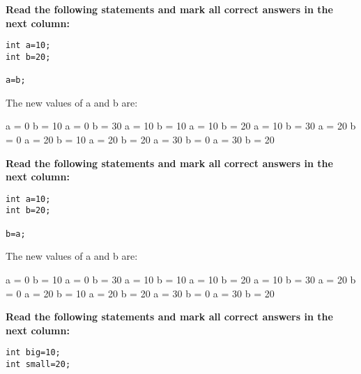 \documentclass[10pt]{exam}
\begin{document}
\begin{questions}
\vspace{1cm}  \begin{minipage}[t][][t]{0.18\textwidth}
    \question \bf Read the following statements and mark all correct answers in the next column: \raggedright

    \begin{lstlisting}
int a=10;
int b=20;

a=b;    
    \end{lstlisting}
  \end{minipage}
  \hfill
  \begin{minipage}[t][][t]{0.75\textwidth}
    The new values of a and b are:
    \begin{multicols*}{3}
\begin{checkboxes}
      \choice a = 0 b = 10
      \choice a = 0 b = 30
      \choice a = 10 b = 10
      \choice a = 10 b = 20
      \choice a = 10 b = 30
      \choice a = 20 b = 0
      \choice a = 20 b = 10
      \choice a = 20 b = 20
      \choice a = 30 b = 0
      \choice a = 30 b = 20
    \end{checkboxes}
\end{multicols*}
  \end{minipage}

\vspace{1cm}  \begin{minipage}[t][][t]{0.18\textwidth}
    \question \bf Read the following statements and mark all correct answers in the next column: \raggedright
    \begin{lstlisting}
int a=10;
int b=20;

b=a;
  \end{lstlisting}
\end{minipage}
  \hfill
\begin{minipage}[t][][t]{0.75\textwidth}
  The new values of a and b are:
  \begin{multicols*}{3}
\begin{checkboxes}
    \choice a = 0 b = 10
    \choice a = 0 b = 30
    \choice a = 10 b = 10
    \choice a = 10 b = 20
    \choice a = 10 b = 30
    \choice a = 20 b = 0
    \choice a = 20 b = 10
    \choice a = 20 b = 20
    \choice a = 30 b = 0
    \choice a = 30 b = 20
  \end{checkboxes}
\end{multicols*}
\end{minipage}

\vspace{1cm}  \begin{minipage}[t][][t]{0.18\textwidth}
\question \bf Read the following statements and mark all correct answers in the next column: \raggedright
  \begin{lstlisting}
int big=10;
int small=20;


\end{lstlisting}
\end{minipage}
\end{questions}
\end{document}
